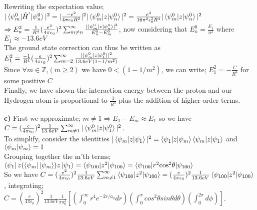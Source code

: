 \documentclass[12pt]{article}
\begin{document}
Rewriting the expectation value; $|\braket{\psi^0_{m}|\hat{H}^{'}|\psi^0_n}|^2=|\frac{-e^2}{4\pi\epsilon_0R^2}|^2|\braket{\psi^0_{m}|z|\psi^0_n}|^2=\frac{e^4}{16\pi^2\epsilon_0^2R^4}|\braket{\psi^0_{m}|z|\psi^0_n}|^2$\\

$\Rightarrow E_n^2=\frac{1}{R^4}(\frac{e^2}{4\pi\epsilon_0})^2\sum_{m\neq n}^\infty\frac{|\braket{\psi^0_{m}|z|\psi^0_n}|^2}{E_n^0-E_m^0}$, now considering that $E_n^0=\frac{E_1}{n^2}$ where $E_1\approx-13.6eV$\\

The ground state correction can thus be written as  $E_1^2=\frac{-1}{R^4}(\frac{e}{4\pi\epsilon_0})^2\sum_{m=2}^\infty\frac{|\braket{\psi^0_{m}|z|\psi^0_1}|^2}{13.6eV(1-1/m^2)}$\\

Since $\forall m\in\mathbb{Z}$,$(m\geq2)$ we have $0<(1-1/m^2)$, we can write; $E_1^2=-\frac{C}{R^4}$ for some positive $C$\\

Finally, we have shown the interaction energy between the proton and our Hydrogen atom is proportional to $\frac{1}{R^4}$ plus the addition of higher order terms.\\

\pagebreak

\textbf{c) }First we approximate; $m\neq1\Rightarrow E_1-E_m\approx E_1$ so we have $C=(\frac{e}{4\pi\epsilon_0})^2\frac{1}{13.6eV}\sum_{m\neq1}^\infty|\braket{\psi^0_{m}|z|\psi^0_1}|^2$. \\

To simplify, consider the identities $|\braket{\psi_{m}|z|\psi_1}|^2=\braket{\psi_1|z|\psi_m}\braket{\psi_m|z|\psi_1}$ and $\braket{\psi_m|\psi_m}=1$\\

Grouping together the m'th terms; $\bra{\psi_1}z(\bra{\psi_m}\ket{\psi_m})z\ket{\psi_1}=\braket{\psi_{100}|z^2|\psi_{100}}=\braket{\psi_{100}|r^2\text{cos}^2\theta|\psi_{100}}$\\

So we have $C=(\frac{e^2}{4\pi\epsilon_0})^2\frac{1}{13.6eV}\sum_{m\neq1}^\infty\braket{\psi_{100}|z^2|\psi_{100}}=(\frac{e}{4\pi\epsilon_0})^2\frac{1}{13.6eV}\braket{\psi_{100}|z^2|\psi_{100}}$, integrating;\\

$C=(\frac{e}{4\pi\epsilon_0})^2\frac{1}{13.6eV}\frac{1}{\pi a_0^3}[({\displaystyle\int_0^\infty}r^4e^{-2r/a_0}dr)({\displaystyle\int_0^\pi}cos^2\theta sin\theta d\theta)({\displaystyle\int_0^{2\pi}}d\phi)]$.\\
\end{document}
